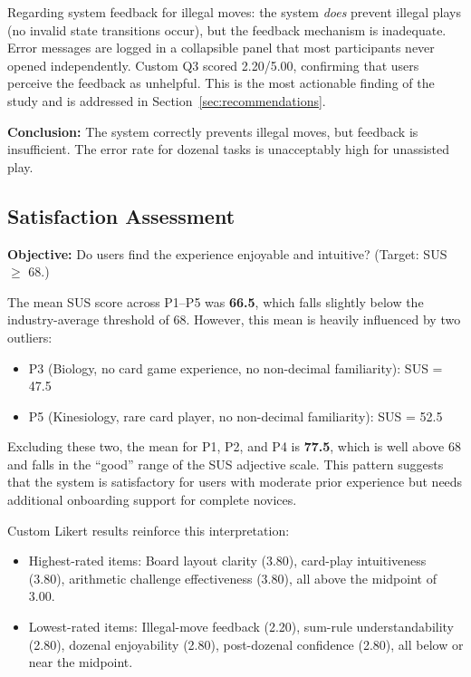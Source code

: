 \documentclass[12pt, titlepage]{article}
\begin{document}
Regarding system feedback for illegal moves: the system \textit{does} prevent illegal plays (no invalid state transitions occur), but the feedback mechanism is inadequate. Error messages are logged in a collapsible panel that most participants never opened independently. Custom Q3 scored 2.20/5.00, confirming that users perceive the feedback as unhelpful. This is the most actionable finding of the study and is addressed in Section~\ref{sec:recommendations}.

\textbf{Conclusion:} The system correctly prevents illegal moves, but feedback is insufficient. The error rate for dozenal tasks is unacceptably high for unassisted play.

\subsection{Satisfaction Assessment}

\textbf{Objective:} Do users find the experience enjoyable and intuitive? (Target: SUS $\geq$ 68.)

The mean SUS score across P1--P5 was \textbf{66.5}, which falls slightly below the industry-average threshold of 68. However, this mean is heavily influenced by two outliers:
\begin{itemize}
  \item P3 (Biology, no card game experience, no non-decimal familiarity): SUS = 47.5
  \item P5 (Kinesiology, rare card player, no non-decimal familiarity): SUS = 52.5
\end{itemize}

Excluding these two, the mean for P1, P2, and P4 is \textbf{77.5}, which is well above 68 and falls in the ``good'' range of the SUS adjective scale. This pattern suggests that the system is satisfactory for users with moderate prior experience but needs additional onboarding support for complete novices.

Custom Likert results reinforce this interpretation:
\begin{itemize}
  \item Highest-rated items: Board layout clarity (3.80), card-play intuitiveness (3.80), arithmetic challenge effectiveness (3.80), all above the midpoint of 3.00.
  \item Lowest-rated items: Illegal-move feedback (2.20), sum-rule understandability (2.80), dozenal enjoyability (2.80), post-dozenal confidence (2.80), all below or near the midpoint.
\end{itemize}
\end{document}
